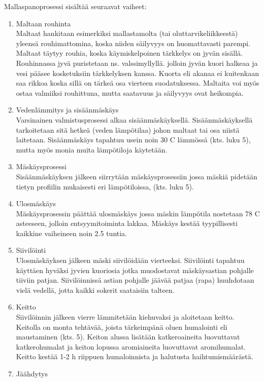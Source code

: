 \documentclass[a4paper,11pt]{report}
\begin{document}
Mallaspanoprosessi sisältää seuraavat vaiheet:
\begin{enumerate}
\item Maltaan rouhinta \hfill \\
Maltaat hankitaan esimerkiksi mallastamolta (tai oluttarvikeliikkeestä) yleensä rouhimattomina, koska niiden säilyvyys on huomattavasti parempi. Maltaat täytyy rouhia, koska käymiskelpoinen tärkkelys on jyvän sisällä. Rouhinnassa jyvä puristetaan ns. valssimyllyllä. jolloin jyvän kuori halkeaa ja vesi pääsee kosketuksiin tärkkelyksen kanssa. Kuorta eli akanaa ei kuitenkaan saa rikkoa koska sillä on tärkeä osa vierteen suodatuksessa. Maltaita voi myös ostaa valmiiksi rouhittuna, mutta saatavuus ja säilyvyys ovat heikompia.
\item Vedenlämmitys ja sisäänmäskäys \hfill \\
Varsinainen valmistusprosessi alkaa sisäänmäskäyksellä. Sisäänmäskäyksellä tarkoitetaan sitä hetkeä (veden lämpötilaa) johon maltaat tai osa niistä laitetaan. Sisäänmäskäys tapahtuu usein noin 30 \degree C lämmössä (kts. luku 5), mutta myös monia muita lämpötiloja käytetään.
\item Mäskäysprosessi \hfill \\
Sisäänmäskäyksen jälkeen siirrytään mäskäysprosessiin jossa mäskiä pidetään tietyn profiilin mukaisesti eri lämpötiloissa, (kts. luku 5).
\item	Ulosmäskäys \hfill \\
Mäskäysprosessin päättää ulosmäskäys jossa mäskin lämpötila nostetaan 78 \degree C asteeseen, jolloin entsyymitoiminta lakkaa. Mäskäys kestää tyypillisesti kaikkine vaiheineen noin 2.5 tuntia.
\item	Siivilöinti \hfill \\
Ulosmäskäyksen jälkeen mäski siivilöidään vierteeksi. Siivilöinti tapahtuu käyttäen hyväksi jyvien kuoriosia jotka muodostavat mäskäysastian pohjalle tiiviin patjan. Siivilöinnissä astian pohjalle jäävää patjaa (rapa) huuhdotaan vielä vedellä, jotta kaikki sokerit saataisiin talteen.
\item Keitto \hfill \\
Siivilöinnin jälkeen vierre lämmitetään kiehuvaksi ja aloitetaan keitto. Keitolla on monta tehtävää, joista tärkeimpänä oluen humalointi eli maustaminen (kts. 5). Keiton alussa lisätään katkeroaineita luovuttavat katkerohumalat ja keiton lopussa aromiaineita luovuttavat aromihumalat. Keitto kestää 1-2 h riippuen humaloinnista ja halutusta haihtumismäärästä.
\item Jäähdytys \hfill \\

\end{enumerate}
\end{document}
